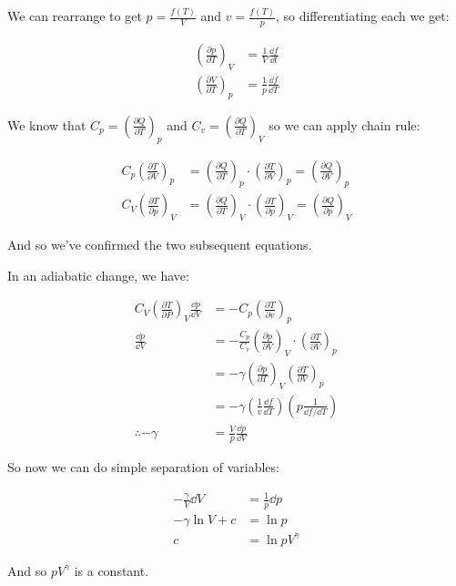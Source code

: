 \documentclass{article}
\begin{document}
\begin{solution}
    We can rearrange to get $p = \frac{f(T)}{V}$ and $v = \frac{f(T)}{p}$, so differentiating each we get:

    \begin{align*}
        \left(\frac{\partial p}{\partial T}\right)_V &= \frac{1}{V} \frac{\dd f}{\dd t}\\
        \left(\frac{\partial V}{\partial T}\right)_p &= \frac{1}{p} \frac{\dd f}{\dd T} 
    \end{align*}

    We know that $C_p = \left(\frac{\partial Q}{\partial T}\right)_p$ and $C_v = \left(\frac{\partial Q}{\partial T}\right)_V$ so we can apply chain rule:


    \begin{align*}
        C_p \left(\frac{\partial T}{\partial V}\right)_p &= \left(\frac{\partial Q}{\partial T}\right)_p \cdot \left(\frac{\partial T}{\partial V}\right)_p = \left(\frac{\partial Q}{\partial V}\right)_p\\
        C_V \left(\frac{\partial T}{\partial p}\right)_V &= \left(\frac{\partial Q}{\partial T}\right)_V \cdot \left(\frac{\partial T}{\partial p}\right)_V = \left(\frac{\partial Q}{\partial p}\right)_V
    \end{align*}

    And so we've confirmed the two subsequent equations.

    In an adiabatic change, we have:

    \begin{align*}
        C_V\left(\frac{\partial T}{\partial P}\right)_V \frac{\dd p}{\dd V} &= -C_p \left(\frac{\partial T}{\partial v}\right)_p\\
        \frac{\dd p}{\dd V} &= -\frac{C_p}{C_v}\left(\frac{\partial p}{\partial V}\right)_V \cdot \left(\frac{\partial T}{\partial V}\right)_p\\
        &= -\gamma \left(\frac{\partial p}{\partial T}\right)_V \left(\frac{\partial T}{\partial V}\right)_p\\
        &= -\gamma\left(\frac{1}{v} \frac{\dd f}{\dd T}\right)\left(p \frac{1}{\dd f/\dd T}\right)\\
        \therefore -\gamma &= \frac{V}{p} \frac{\dd p}{\dd V}
    \end{align*}

    So now we can do simple separation of variables:

    \begin{align*}
        -\frac{\gamma}{V} \dd V &= \frac{1}{p} \dd p\\
        -\gamma \ln V + c &= \ln p\\
        c &= \ln pV^{\gamma}
    \end{align*}

    And so $pV^\gamma$ is a constant.
    
\end{solution}
\end{document}

